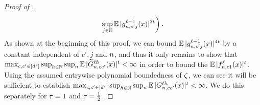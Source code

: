 \begin{proof}[Proof of ]
\begin{align*}
            \sup_{j \in \mathbb{N}}
            \operatorname*{\mathbb{E}} |
                {g}^{\ell - 1}_{n, c' j}{(x)}
            |^{2t}
        \biggr)
        \, .
    \end{align*}
    As shown at the beginning of this proof, we can bound
    $
        \operatorname*{\mathbb{E}} |
            {g}^{\ell - 1}_{n, c' j}{(x)}
        |^{4t}
    $
    by a constant independent of $c', j$ and $n$, and thus it only remains to show that
    $
        \max_{c, c' \in [d^s]}
        \sup_{\substack{
            h \in \mathbb{N}
        }}
        \sup_{n}
            \operatorname*{\mathbb{E}} |
                \widetilde{G}_{n, c c'}^{\ell h} (x)
            |^t
        <
        \infty
    $
    in order to bound the $\operatorname*{\mathbb{E}} | {f}^{\ell}_{n, c 1}{(x)} |^t$.
    Using the assumed entrywise polynomial boundedness of $\zeta$, we can see it will be sufficient to establish
    $
        \max_{c, c' \in [d^s]}
        \sup_{\substack{
            h \in \mathbb{N}
        }}
        \sup_{n}
            \operatorname*{\mathbb{E}} |
                G_{n, c c'}^{\ell h} (x)
            |^t
        <
        \infty
    $.
    We do this separately for $\tau = 1$ and $\tau = \frac{1}{2}$.
    

\end{proof}
